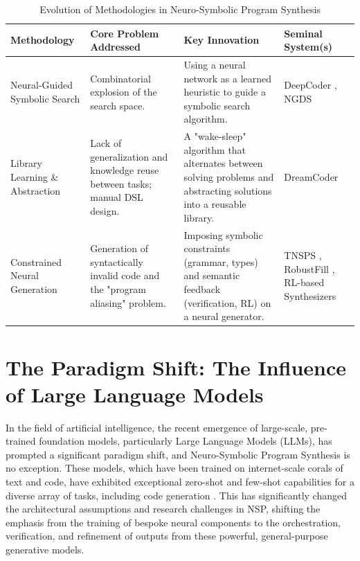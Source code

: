 \documentclass[12pt, a4paper]{report}
\begin{document}
\begin{table}[ht]
\centering
\caption{Evolution of Methodologies in Neuro-Symbolic Program Synthesis}
\label{tab:nsp_methodologies_evolution}
\begin{tabular}{|p{}|p{}|p{}|p{}|}
\hline
\textbf{Methodology} & \textbf{Core Problem Addressed} & \textbf{Key Innovation} & \textbf{Seminal System(s)} \\
\hline
Neural-Guided Symbolic Search & Combinatorial explosion of the search space. & Using a neural network as a learned heuristic to guide a symbolic search algorithm. & DeepCoder \citep{balog2017deepcoder}, NGDS \citep{ellis2021dreamcoder} \\
\hline
Library Learning \& Abstraction & Lack of generalization and knowledge reuse between tasks; manual DSL design. & A "wake-sleep" algorithm that alternates between solving problems and abstracting solutions into a reusable library. & DreamCoder \citep{ellis2021dreamcoder} \\
\hline
Constrained Neural Generation & Generation of syntactically invalid code and the "program aliasing" problem. & Imposing symbolic constraints (grammar, types) and semantic feedback (verification, RL) on a neural generator. & TNSPS \citep{hu2021iraven}, RobustFill \citep{devlin2017robustfill}, RL-based Synthesizers \citep{chen2018execution} \\
\hline
\end{tabular}
\end{table}

\section{The Paradigm Shift: The Influence of Large Language Models}
In the field of artificial intelligence, the recent emergence of large-scale, pre-trained foundation models, particularly Large Language Models (LLMs), has prompted a significant paradigm shift, and Neuro-Symbolic Program Synthesis is no exception. These models, which have been trained on internet-scale corals of text and code, have exhibited exceptional zero-shot and few-shot capabilities for a diverse array of tasks, including code generation \citep{cranmer2020interpretable}. This has significantly changed the architectural assumptions and research challenges in NSP, shifting the emphasis from the training of bespoke neural components to the orchestration, verification, and refinement of outputs from these powerful, general-purpose generative models.
\end{document}
